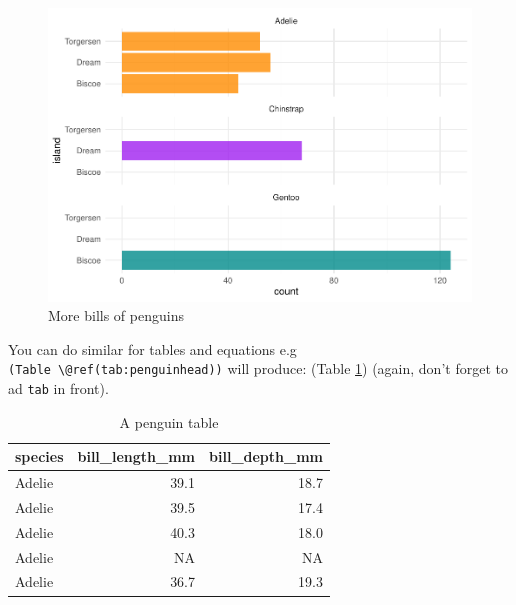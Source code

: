 \documentclass[
]{book}
\newenvironment{Shaded}{\begin{snugshade}}{\end{snugshade}}
\newcommand{\DataTypeTok}[1]{\textcolor[rgb]{0.13,0.29,0.53}{#1}}
\newcommand{\DecValTok}[1]{\textcolor[rgb]{0.00,0.00,0.81}{#1}}
\newcommand{\KeywordTok}[1]{\textcolor[rgb]{0.13,0.29,0.53}{\textbf{#1}}}
\newcommand{\NormalTok}[1]{#1}
\newcommand{\OperatorTok}[1]{\textcolor[rgb]{0.81,0.36,0.00}{\textbf{#1}}}
\newcommand{\StringTok}[1]{\textcolor[rgb]{0.31,0.60,0.02}{#1}}
\begin{document}
\begin{figure}
\centering
\includegraphics{telling_stories_with_data_files/figure-latex/billssssss-1.pdf}
\caption{\label{fig:billssssss}More bills of penguins}
\end{figure}

You can do similar for tables and equations e.g \texttt{(Table\ \textbackslash{}@ref(tab:penguinhead))} will produce: (Table \ref{tab:penguinhead}) (again, don't forget to ad \texttt{tab} in front).

\begin{Shaded}
\end{Shaded}

\begin{table}

\caption{\label{tab:penguinhead}A penguin table}
\centering
\begin{tabular}[t]{l|r|r}
\hline
species & bill\_length\_mm & bill\_depth\_mm\\
\hline
Adelie & 39.1 & 18.7\\
\hline
Adelie & 39.5 & 17.4\\
\hline
Adelie & 40.3 & 18.0\\
\hline
Adelie & NA & NA\\
\hline
Adelie & 36.7 & 19.3\\
\hline
\end{tabular}
\end{table}
\end{document}
